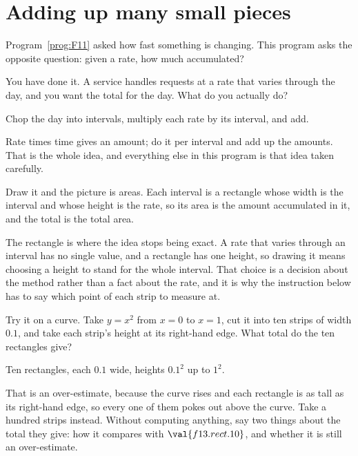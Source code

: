 \section{Adding up many small pieces}
\label{sec:F13-accumulate}

\begin{fr}
Program~\ref{prog:F11} asked how fast something is changing. This program asks
the opposite question: given a rate, how much accumulated?

You have done it. A service handles requests at a rate that varies through the
day, and you want the total for the day. What do you actually do?
\nextframe
\end{fr}

\begin{fr}
\begin{ansblock}
Chop the day into intervals, multiply each rate by its interval, and add.
\end{ansblock}

Rate times time gives an amount; do it per interval and add up the amounts.
That is the whole idea, and everything else in this program is that idea taken
carefully.

Draw it and the picture is areas. Each interval is a rectangle whose width is
the interval and whose height is the rate, so its area is the amount
accumulated in it, and the total is the total area.

The rectangle is where the idea stops being exact. A rate that varies through
an interval has no single value, and a rectangle has one height, so drawing it
means choosing a height to stand for the whole interval. That choice is a
decision about the method rather than a fact about the rate, and it is why the
instruction below has to say which point of each strip to measure at.

Try it on a curve. Take $y = x^{2}$ from $x = 0$ to $x = 1$, cut it into ten
strips of width $\num{0.1}$, and take each strip's height at its right-hand
edge. What total do the ten rectangles give?
\dotline
\nextframe
\end{fr}

\begin{fr}
Ten rectangles, each $\num{0.1}$ wide, heights $\num{0.1}^{2}$ up to
$1^{2}$.

That is an over-estimate, because the curve rises and each rectangle is as
tall as its right-hand edge, so every one of them pokes out above the curve.
Take a hundred strips instead. Without computing anything, say two things
about the total they give: how it compares with $\val{f13.rect.10}$, and
whether it is still an over-estimate.
\nextframe
\end{fr}

